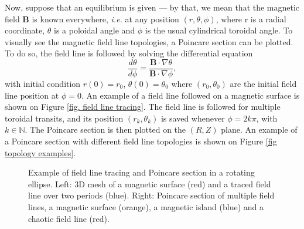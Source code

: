 \documentclass[my_thesis.tex]{subfiles}
\begin{document}
Now, suppose that an equilibrium is given --- by that, we mean that the magnetic field $\mathbf{B}$ is known everywhere, \textit{i.e.} at any position $(r,\theta,\phi)$, where r is a radial coordinate, $\theta$ is a poloidal angle and $\phi$ is the usual cylindrical toroidal angle. To visually see the magnetic field line topologies, a Poincare section can be plotted. To do so, the field line is followed by solving the differential equation
\begin{equation}
	\frac{d\theta}{d\phi} = \frac{\mathbf{B}\cdot\nabla\theta}{\mathbf{B}\cdot\nabla\phi},
\end{equation}
with initial condition $r(0)=r_0$, $\theta(0)=\theta_0$ where $(r_0,\theta_0)$ are the initial field line position at $\phi=0$. An example of a field line followed on a magnetic surface is shown on Figure \ref{fig. field line tracing}. The field line is followed for multiple toroidal transits, and its position $(r_k,\theta_k)$ is saved whenever $\phi=2k\pi$, with $k\in\mathbb{N}$. The Poincare section is then plotted on the $(R,Z)$ plane. An example of a Poincare section with different field line topologies is shown on Figure \ref{fig topology examples}.

\begin{figure}
	\centering
	\hfill
	\caption{Example of field line tracing and Poincare section in a rotating ellipse. Left: 3D mesh of a magnetic surface (red) and a traced field line over two periods (blue). Right: Poincare section of multiple field lines, a magnetic surface (orange), a magnetic island (blue) and a chaotic field line (red).}
	\label{fig poincare section}
\end{figure}
\end{document}
